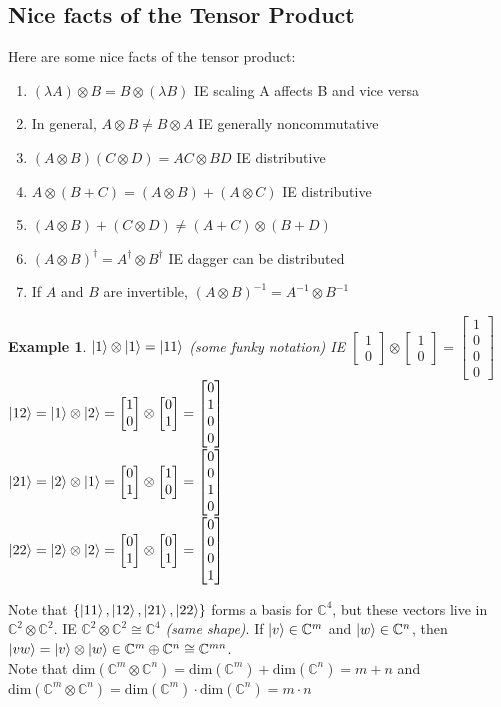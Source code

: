 \documentclass[12pt]{article}
\theoremstyle{plain}
\theoremstyle{nonumberplain}
\theoremstyle{plain}
\newtheorem{example}[lemma]{Example}
\theoremstyle{nonumberplain}
\newcommand\1{{\bf 1}}
\newcommand{\bmat}[1]{\begin{bmatrix*} #1 \end{bmatrix*}} %
\newcommand{\C}{\mathbb{C}} %
\newcommand{\<}{\left\langle}
\renewcommand{\>}{\right\rangle}
\begin{document}
\subsection{Nice facts of the Tensor Product}
Here are some nice facts of the tensor product:
\begin{enumerate}
\item $(\lambda A)\otimes B=B \otimes (\lambda B)$ IE scaling A affects B and vice versa
\item In general, $A\otimes B\neq B\otimes A$ IE generally noncommutative
\item $(A\otimes B)(C \otimes D)=AC\otimes BD$ IE distributive
\item $A\otimes (B+C)=(A\otimes B)+(A\otimes C)$ IE distributive
\item $(A\otimes B)+(C\otimes D)\neq (A + C)\otimes (B + D)$
\item $(A\otimes B)^\dagger=A^\dagger \otimes B^\dagger$ IE dagger can be distributed
\item If $A$ and $B$ are invertible, $(A\otimes B)^{-1}=A^{-1} \otimes B^{-1}$
\end{enumerate}

\begin{example}
$\ket{1}\otimes\ket{1}=\ket{11}$ (some funky notation)
IE $\bmat{1 \\ 0}\otimes\bmat{1 \\ 0}=\bmat{1 \\ 0 \\ 0 \\ 0}$ \\
$\ket{12}=\ket{1}\otimes\ket{2}=\bmat{1 \\ 0}\otimes\bmat{0 \\ 1}=\bmat{0 \\ 1 \\ 0 \\ 0}$ \\
$\ket{21}=\ket{2}\otimes\ket{1}=\bmat{0 \\ 1}\otimes\bmat{1 \\ 0}=\bmat{0 \\ 0 \\ 1 \\ 0}$ \\
$\ket{22}=\ket{2}\otimes\ket{2}=\bmat{0 \\ 1}\otimes\bmat{0 \\ 1}=\bmat{0 \\ 0 \\ 0 \\ 1}$ \\
\end{example}
Note that $\left\lbrace\ket{11},\ket{12},\ket{21},\ket{22}\right\rbrace$ forms a basis for $\C^4$, but these vectors live in $\C^2\otimes\C^2$. IE $\C^2\otimes\C^2\cong\C^4$ \textit{(same shape)}. If $\ket{v}\in\C^m$ and $\ket{w}\in\C^n$, then $\ket{vw}=\ket{v}\otimes\ket{w}\in\C^m\oplus\C^n\cong\C^{mn}$. \\
Note that $\text{dim}\left(\C^m\otimes\C^n\right)=\text{dim}\left(\C^m\right) + \text{dim}\left(\C^n\right)=m+n$ and $\text{dim}\left(\C^m\otimes\C^n\right)=\text{dim}\left(\C^m\right) \cdot \text{dim}\left(\C^n\right)=m\cdot n$
\end{document}
